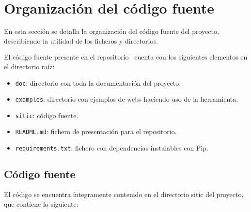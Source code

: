 
\section{Organización del código fuente}

En esta sección se detalla la organización del código fuente del proyecto,
describiendo la utilidad de los ficheros y directorios.

El código fuente presente en el repositorio~\cite{repositorio} cuenta con los siguientes
elementos en el directorio raíz:

\begin{itemize}
    \item \texttt{doc}: directorio con toda la documentación del proyecto.
    \item \texttt{examples}: directorio con ejemplos de webs haciendo uso de la herramienta.
    \item \texttt{sitic}: código fuente.
    \item \texttt{README.md}: fichero de presentación para el repositorio.
    \item \texttt{requirements.txt}: fichero con dependencias instalables con Pip.
\end{itemize}

\subsection{Código fuente}

El código se encuentra íntegramente contenido en el directorio sitic del proyecto, que contiene lo siguiente:

